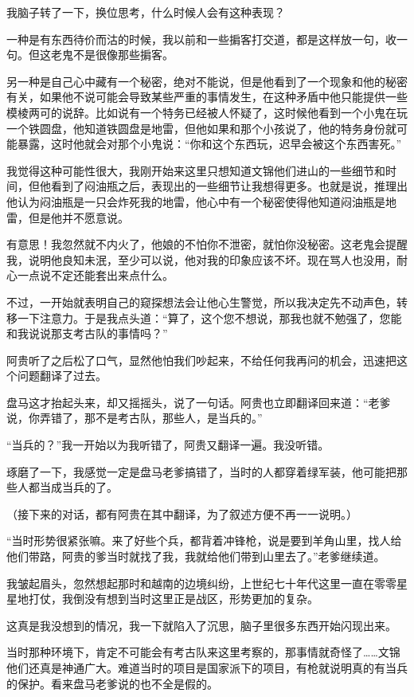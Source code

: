 我脑子转了一下，换位思考，什么时候人会有这种表现？

一种是有东西待价而沽的时候，我以前和一些掮客打交道，都是这样放一句，收一句。但这老鬼不是很像那些掮客。

另一种是自己心中藏有一个秘密，绝对不能说，但是他看到了一个现象和他的秘密有关，如果他不说可能会导致某些严重的事情发生，在这种矛盾中他只能提供一些模棱两可的说辞。比如说有一个特务已经被人怀疑了，这时候他看到一个小鬼在玩一个铁圆盘，他知道铁圆盘是地雷，但他如果和那个小孩说了，他的特务身份就可能暴露，这时他就会对那个小鬼说：“你和这个东西玩，迟早会被这个东西害死。”

我觉得这种可能性很大，我刚开始来这里只想知道文锦他们进山的一些细节和时间，但他看到了闷油瓶之后，表现出的一些细节让我想得更多。也就是说，推理出他认为闷油瓶是一只会炸死我的地雷，他心中有一个秘密使得他知道闷油瓶是地雷，但是他并不愿意说。

有意思！我忽然就不内火了，他娘的不怕你不泄密，就怕你没秘密。这老鬼会提醒我，说明他良知未泯，至少可以说，他对我的印象应该不坏。现在骂人也没用，耐心一点说不定还能套出来点什么。

不过，一开始就表明自己的窥探想法会让他心生警觉，所以我决定先不动声色，转移一下注意力。于是我点头道：“算了，这个您不想说，那我也就不勉强了，您能和我说说那支考古队的事情吗？”

阿贵听了之后松了口气，显然他怕我们吵起来，不给任何我再问的机会，迅速把这个问题翻译了过去。

盘马这才抬起头来，却又摇摇头，说了一句话。阿贵也立即翻译回来道：“老爹说，你弄错了，那不是考古队，那些人，是当兵的。”

“当兵的？”我一开始以为我听错了，阿贵又翻译一遍。我没听错。

琢磨了一下，我感觉一定是盘马老爹搞错了，当时的人都穿着绿军装，他可能把那些人都当成当兵的了。

（接下来的对话，都有阿贵在其中翻译，为了叙述方便不再一一说明。）

“当时形势很紧张嘛。来了好些个兵，都背着冲锋枪，说是要到羊角山里，找人给他们带路，阿贵的爹当时就找了我，我就给他们带到山里去了。”老爹继续道。

我皱起眉头，忽然想起那时和越南的边境纠纷，上世纪七十年代这里一直在零零星星地打仗，我倒没有想到当时这里正是战区，形势更加的复杂。

这真是我没想到的情况，我一下就陷入了沉思，脑子里很多东西开始闪现出来。

当时那种环境下，肯定不可能会有考古队来这里考察的，那事情就奇怪了……文锦他们还真是神通广大。难道当时的项目是国家派下的项目，有枪就说明真的有当兵的保护。看来盘马老爹说的也不全是假的。

